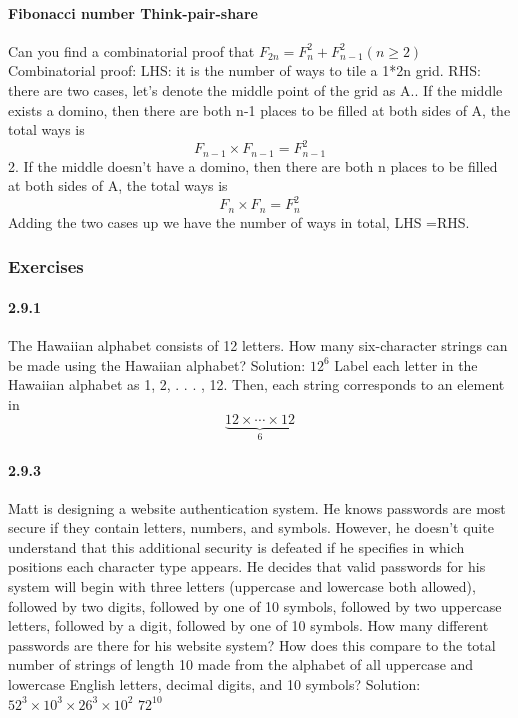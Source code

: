 \documentclass{article}
\begin{document}
\paragraph{Fibonacci number Think-pair-share}
Can you find a combinatorial proof that $F_{2n}=F_n^2+F^2_{n-1} (n\ge 2)$\newline
Combinatorial proof:\newline
LHS: it is the number of ways to tile a 1*2n grid.\newline
RHS: there are two cases, let's denote the middle point of the grid as A.. If the middle exists a domino, then there are both n-1 places to be filled at both sides of A, the total ways is$$F_{n-1}\times F_{n-1}=F^2_{n-1}$$
2. If the middle doesn't have a domino, then there are both n places to be filled at both sides of A, the total ways is$$F_{n}\times F_{n}=F^2_{n}$$
Adding the two cases up we have the number of ways in total,  LHS =RHS.
\subsubsection{Exercises}
\paragraph{2.9.1}
The Hawaiian alphabet consists of 12 letters. How many six-character strings can
be made using the Hawaiian alphabet?\newline
Solution:\newline
$12^6$\newline
Label each letter in the Hawaiian alphabet as 1, 2, . . . , 12. Then, each string corresponds
to an element in
$$\underbrace{12\times \cdots \times 12}_{6}$$
\paragraph{2.9.3}
Matt is designing a website authentication system. He knows passwords are most
secure if they contain letters, numbers, and symbols. However, he doesn’t quite understand that this additional security is defeated if he specifies in which positions each
character type appears. He decides that valid passwords for his system will begin with
three letters (uppercase and lowercase both allowed), followed by two digits, followed
by one of 10 symbols, followed by two uppercase letters, followed by a digit, followed
by one of 10 symbols. How many different passwords are there for his website system?
How does this compare to the total number of strings of length 10 made from the alphabet of all uppercase and lowercase English letters, decimal digits, and 10 symbols?\newline
Solution:\newline
$52^3\times 10^3 \times 26^3 \times 10^2$\newline
$72^{10}$
\end{document}
